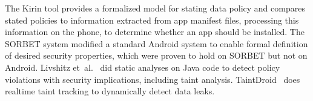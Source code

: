 {The Kirin tool \cite{enck2009understanding} provides a formalized model for stating data policy and compares stated policies to information extracted from app manifest files, processing this information on the phone, to determine whether an app should be installed.
The SORBET \cite{fragkaki2012modeling} system modified a standard Android system to enable formal definition of desired security properties, which were proven to hold on SORBET but not on Android. 
Livshitz et\ al.~\cite{livshits2005finding} did static analyses on Java code to detect policy violations with security implications, including taint analysis.
TaintDroid~\cite{enck2010taintdroid} does realtime taint tracking to dynamically detect data leaks. 

}
